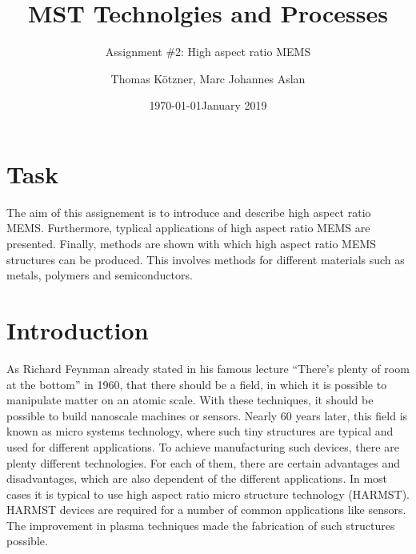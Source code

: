 \documentclass[a4paper,
  twoside, %
  headlines=2.1 %
  ]{scrartcl}
\author{\yourname}
\title{\lecture}
\title{MST Technolgies and Processes}
\subtitle{Assignment \#2: High aspect ratio MEMS}
\date{\today}
\author{Thomas Kötzner, Marc Johannes Aslan}
\date{January 2019}
\begin{document}
\maketitle

\section{Task}
The aim of this assignement is to introduce and describe high aspect ratio MEMS. Furthermore, typlical applications of high aspect ratio MEMS are presented. Finally, methods are shown with which high aspect ratio MEMS structures can be produced. This involves methods for different materials such as metals, polymers and semiconductors.

\section{Introduction}
As Richard Feynman already stated in his famous lecture \enquote{There's plenty of room at the bottom} in 1960, that there should be a field, in which it is possible to manipulate matter on an atomic scale. \cite{feynman2012} With these techniques, it should be possible to build nanoscale machines or sensors. Nearly 60 years later, this field is known as micro systems technology, where such tiny structures are typical and used for different applications. To achieve manufacturing such devices, there are plenty different technologies. For each of them, there are certain advantages and disadvantages, which are also dependent of the different applications. In most cases it is typical to use high aspect ratio micro structure technology (HARMST). HARMST devices are required for a number of common applications like sensors. The improvement in plasma techniques made the fabrication of such structures possible. 
\end{document}
